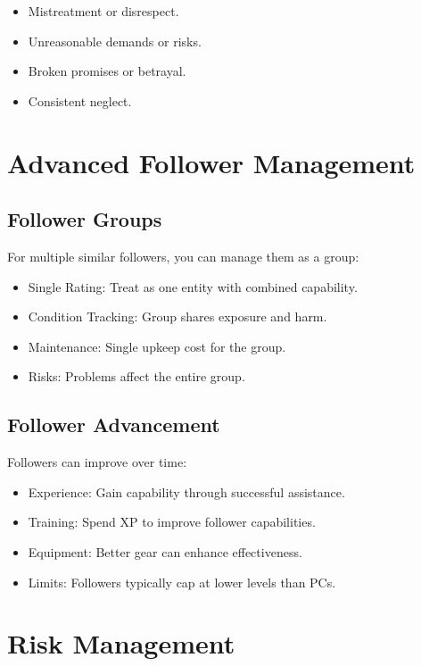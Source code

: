 \documentclass[11pt,twoside,openany]{book}
\begin{document}
\begin{itemize}
\item Mistreatment or disrespect.
\item Unreasonable demands or risks.
\item Broken promises or betrayal.
\item Consistent neglect.
\end{itemize}

\section*{Advanced Follower Management} 

\subsection*{Follower Groups}

For multiple similar followers, you can manage them as a group:
\begin{itemize}
\item Single Rating: Treat as one entity with combined capability.
\item Condition Tracking: Group shares exposure and harm.
\item Maintenance: Single upkeep cost for the group.
\item Risks: Problems affect the entire group.
\end{itemize}

\subsection*{Follower Advancement}

Followers can improve over time:
\begin{itemize}
\item Experience: Gain capability through successful assistance.
\item Training: Spend XP to improve follower capabilities.
\item Equipment: Better gear can enhance effectiveness.
\item Limits: Followers typically cap at lower levels than PCs.
\end{itemize}

\section*{Risk Management} 
\end{document}
